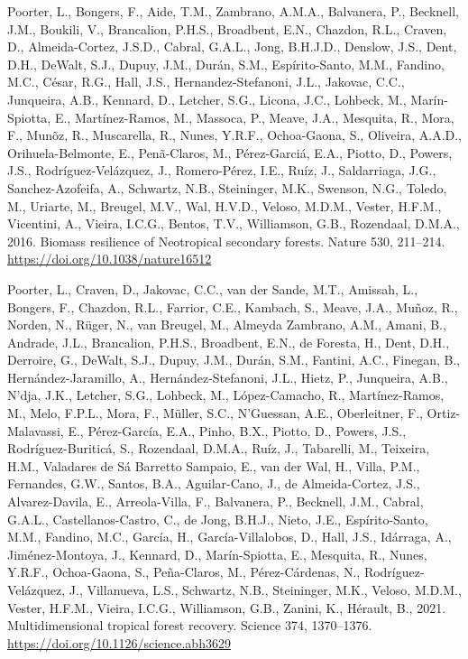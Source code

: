 \documentclass[
  12pt,
]{article}
\newlength{\cslhangindent}
\newlength{\cslentryspacingunit} %
\newenvironment{CSLReferences}[2] %
 {%
  \setlength{\parindent}{0pt}
  \ifodd #1
  \let\oldpar\par
  \def\par{\hangindent=\cslhangindent\oldpar}
  \fi
  \setlength{\parskip}{#2\cslentryspacingunit}
 }%
 {}
\begin{document}
\begin{CSLReferences}{1}{0}
\leavevmode{}%
Poorter, L., Bongers, F., Aide, T.M., Zambrano, A.M.A., Balvanera, P., Becknell, J.M., Boukili, V., Brancalion, P.H.S., Broadbent, E.N., Chazdon, R.L., Craven, D., Almeida-Cortez, J.S.D., Cabral, G.A.L., Jong, B.H.J.D., Denslow, J.S., Dent, D.H., DeWalt, S.J., Dupuy, J.M., Durán, S.M., Espírito-Santo, M.M., Fandino, M.C., César, R.G., Hall, J.S., Hernandez-Stefanoni, J.L., Jakovac, C.C., Junqueira, A.B., Kennard, D., Letcher, S.G., Licona, J.C., Lohbeck, M., Marín-Spiotta, E., Martínez-Ramos, M., Massoca, P., Meave, J.A., Mesquita, R., Mora, F., Munõz, R., Muscarella, R., Nunes, Y.R.F., Ochoa-Gaona, S., Oliveira, A.A.D., Orihuela-Belmonte, E., Penã-Claros, M., Pérez-Garciá, E.A., Piotto, D., Powers, J.S., Rodríguez-Velázquez, J., Romero-Pérez, I.E., Ruíz, J., Saldarriaga, J.G., Sanchez-Azofeifa, A., Schwartz, N.B., Steininger, M.K., Swenson, N.G., Toledo, M., Uriarte, M., Breugel, M.V., Wal, H.V.D., Veloso, M.D.M., Vester, H.F.M., Vicentini, A., Vieira, I.C.G., Bentos, T.V., Williamson, G.B., Rozendaal, D.M.A., 2016. Biomass resilience of {Neotropical} secondary forests. Nature 530, 211--214. \url{https://doi.org/10.1038/nature16512}

\leavevmode{}%
Poorter, L., Craven, D., Jakovac, C.C., van der Sande, M.T., Amissah, L., Bongers, F., Chazdon, R.L., Farrior, C.E., Kambach, S., Meave, J.A., Muñoz, R., Norden, N., Rüger, N., van Breugel, M., Almeyda Zambrano, A.M., Amani, B., Andrade, J.L., Brancalion, P.H.S., Broadbent, E.N., de Foresta, H., Dent, D.H., Derroire, G., DeWalt, S.J., Dupuy, J.M., Durán, S.M., Fantini, A.C., Finegan, B., Hernández-Jaramillo, A., Hernández-Stefanoni, J.L., Hietz, P., Junqueira, A.B., N'dja, J.K., Letcher, S.G., Lohbeck, M., López-Camacho, R., Martínez-Ramos, M., Melo, F.P.L., Mora, F., Müller, S.C., N'Guessan, A.E., Oberleitner, F., Ortiz-Malavassi, E., Pérez-García, E.A., Pinho, B.X., Piotto, D., Powers, J.S., Rodríguez-Buriticá, S., Rozendaal, D.M.A., Ruíz, J., Tabarelli, M., Teixeira, H.M., Valadares de Sá Barretto Sampaio, E., van der Wal, H., Villa, P.M., Fernandes, G.W., Santos, B.A., Aguilar-Cano, J., de Almeida-Cortez, J.S., Alvarez-Davila, E., Arreola-Villa, F., Balvanera, P., Becknell, J.M., Cabral, G.A.L., Castellanos-Castro, C., de Jong, B.H.J., Nieto, J.E., Espírito-Santo, M.M., Fandino, M.C., García, H., García-Villalobos, D., Hall, J.S., Idárraga, A., Jiménez-Montoya, J., Kennard, D., Marín-Spiotta, E., Mesquita, R., Nunes, Y.R.F., Ochoa-Gaona, S., Peña-Claros, M., Pérez-Cárdenas, N., Rodríguez-Velázquez, J., Villanueva, L.S., Schwartz, N.B., Steininger, M.K., Veloso, M.D.M., Vester, H.F.M., Vieira, I.C.G., Williamson, G.B., Zanini, K., Hérault, B., 2021. Multidimensional tropical forest recovery. Science 374, 1370--1376. \url{https://doi.org/10.1126/science.abh3629}


\end{CSLReferences}
\end{document}
